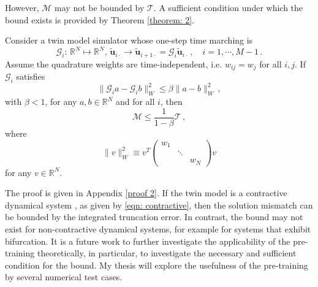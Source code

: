 However, $\mathcal{M}$ may not be bounded by
$\mathcal{T}$. A sufficient condition under which the bound exists is provided
by Theorem \ref{theorem: 2}.\\

\begin{theorem}
    Consider a twin model simulator whose one-step time marching is
    \begin{equation}
        \mathcal{G}_i:\, \mathbb{R}^N\mapsto\mathbb{R}^N,\, \tilde{\boldsymbol{u}}_{i\cdot}\rightarrow 
        \tilde{\boldsymbol{u}}_{i+1\cdot}=\mathcal{G}_i
        \tilde{\boldsymbol{u}}_{i\cdot} \,,\quad i=1,\cdots, M-1\,.
    \end{equation}
    Assume the quadrature weights are time-independent, i.e.
    $w_{ij} = w_{j}$ for all $i,j$.
    If $\mathcal{G}_i$ satisfies
    \begin{equation}
        \|\mathcal{G}_ia-\mathcal{G}_ib\|^2_{W} \le \beta \|a-b\|^2_{W} \,,
        \label{eqn: contractive}
    \end{equation}
    with $\beta<1$,
    for any $a, b \in \mathbb{R}^N$ and for all $i$,
    then 
    \begin{equation}
        \mathcal{M} \le \frac{1}{1-\beta} \mathcal{T}\,,
    \end{equation}
    where
    \begin{equation}
        \|v\|^2_{W} \equiv v^T 
            \begin{pmatrix}
                {w_{1}} && \\
                & \ddots & \\
                && {w_{N}}
            \end{pmatrix} v
    \end{equation}
    for any $v\in \mathbb{R}^N$.
    \label{theorem: 2}
\end{theorem}
The proof is given in Appendix \ref{proof 2}. If the twin model is a contractive dynamical 
system \cite{contractive system}, as given by \eqref{eqn: contractive}, then the
solution mismatch can be bounded by the integrated truncation error. In contrast, 
the bound may not exist for non-contractive dynamical systems, for example for systems 
that exhibit bifurcation. It is a future work to further investigate the applicability of the pre-training
theoretically, in particular, to investigate the necessary and sufficient condition for the bound. 
My thesis will explore the usefulness of the pre-training by several numerical test cases.\\

